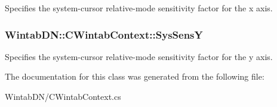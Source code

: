 Specifies the system-\/cursor relative-\/mode sensitivity factor for the x axis. 

\hypertarget{class_wintab_d_n_1_1_c_wintab_context_a426735ad2514eb9f0fe7470051288b28}{
\subsubsection[{SysSensY}]{ WintabDN::CWintabContext::SysSensY}}
\label{class_wintab_d_n_1_1_c_wintab_context_a426735ad2514eb9f0fe7470051288b28}


Specifies the system-\/cursor relative-\/mode sensitivity factor for the y axis. 



The documentation for this class was generated from the following file:\begin{DoxyCompactItemize}
\item 
WintabDN/CWintabContext.cs\end{DoxyCompactItemize}
